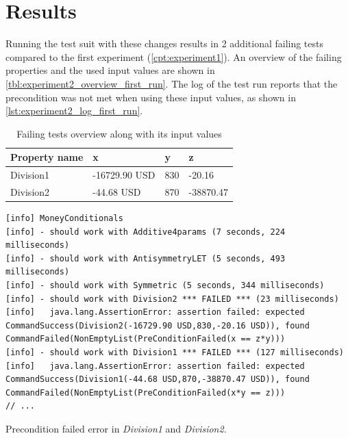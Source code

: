 \section{Results}
Running the test suit with these changes results in 2 additional failing tests
compared to the first experiment (\autoref{cpt:experiment1}). An overview of the
failing properties and the used input values are shown in
\autoref{tbl:experiment2_overview_first_run}. The log of the test run reports
that the precondition was not met when using these input values, as shown in
\autoref{lst:experiment2_log_first_run}.
\FloatBarrier
\begin{table}[!ht]
\centering
\begin{tabular}{llll}
\hline
\textbf{Property name} & \textbf{x}    & \textbf{y} & \textbf{z} \\ \hline
Division1              & -16729.90 USD & 830        & -20.16     \\
Division2              & -44.68 USD    & 870        & -38870.47  \\ \hline
\end{tabular}
\caption{Failing tests overview along with its input values}
\label{tbl:experiment2_overview_first_run}
\end{table}
\FloatBarrier

\FloatBarrier
\begin{sourcecode}[!ht]
\begin{lstlisting}[language=Log]
[info] MoneyConditionals
[info] - should work with Additive4params (7 seconds, 224 milliseconds)
[info] - should work with AntisymmetryLET (5 seconds, 493 milliseconds)
[info] - should work with Symmetric (5 seconds, 344 milliseconds)
[info] - should work with Division2 *** FAILED *** (23 milliseconds)
[info]   java.lang.AssertionError: assertion failed: expected CommandSuccess(Division2(-16729.90 USD,830,-20.16 USD)), found CommandFailed(NonEmptyList(PreConditionFailed(x == z*y)))
[info] - should work with Division1 *** FAILED *** (127 milliseconds)
[info]   java.lang.AssertionError: assertion failed: expected CommandSuccess(Division1(-44.68 USD,870,-38870.47 USD)), found CommandFailed(NonEmptyList(PreConditionFailed(x*y == z)))
// ...
\end{lstlisting}
\caption{Precondition failed error in \textit{Division1} and \textit{Division2}.}
\label{lst:experiment2_log_first_run}
\end{sourcecode}
\FloatBarrier


